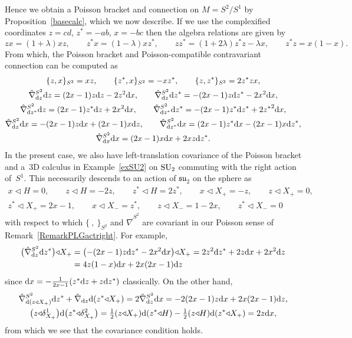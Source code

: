 \documentclass[10pt,a4paper]{amsart}
\numberwithin{equation}{section}
\newcommand{\<}{{\langle}}
\renewcommand{\>}{{\rangle}}
\newcommand{\extd}{{\rm d}}
\newcommand{\ra}{{\triangleleft}}
\begin{document}
\begin{Example}
Hence we obtain a Poisson bracket and connection on $M=S^2/S^1$ by Proposition~\ref{basecalc}, which we now describe. If we use the complexified coordinates $z=cd$, $z^*=-ab$, $x=-bc$ then the algebra relations are given by
\[ zx=(1+\lambda)xz, \qquad z^*x=(1-\lambda)xz^*, \qquad zz^*=(1+2\lambda)z^*z-\lambda x, \qquad z^*z=x(1-x).\]
From which, the Poisson bracket and Poisson-compatible contravariant connection can be computed as
\begin{gather*}
 \{ z,x \}_{S^2}=xz, \qquad \{ z^*,x \}_{S^2}=-xz^*, \qquad \{ z,z^* \}_{S^2}=2z^*zx, \\
\hat\nabla^{S^2}_{\extd z}\extd z=(2x-1)z\extd z-2z^2\extd x, \qquad \hat\nabla^{S^2}_{\extd z}\extd z^*=-(2x-1)z\extd z^*-2x^2\extd x,\\
\hat\nabla^{S^2}_{\extd z^*}\extd z=(2x-1)z^*\extd z+2x^2\extd x, \qquad \hat\nabla^{S^2}_{\extd z^*}\extd z^*=-(2x-1)z^*\extd z^*+2{z^*}^2\extd x, \\
 \hat\nabla^{S^2}_{\extd z}\extd x=-(2x-1)z\extd x+(2x-1)x\extd z, \qquad \hat\nabla^{S^2}_{\extd z^*}\extd x=(2x-1)z^*\extd x-(2x-1)x\extd z^*,\\
 \hat\nabla^{S^2}_{\extd x}\extd x=(2x-1)x\extd x+2xz\extd z^*.\end{gather*}
In the present case, we also have left-translation covariance of the Poisson bracket and a~3D calculus in Example~\ref{exSU2} on ${\rm SU}_2$ commuting with the right action of~$S^1$. This necessarily descends to an action of ${\mathfrak{su}}_2$ on the sphere as
\begin{gather*} x\ra H=0, \qquad z\ra H= -2z, \qquad z^*\ra H=2z^*,\qquad x\ra X_+=-z,\qquad z\ra X_+= 0,\\
z^*\ra X_+=2x-1,\qquad x\ra X_-=z^*, \qquad z\ra X_-=1-2x, \qquad z^*\ra X_-=0\end{gather*}
with respect to which $\{\ ,\ \}_{S^2}$ and $\hat\nabla^{S^2}$ are covariant in our Poisson sense of Remark~\ref{RemarkPLGactright}. For example,
\begin{align*} \big(\hat\nabla^{S^2}_{\extd z}\extd z^*\big)\ra X_+&=\big({-}(2x-1)z\extd z^*-2x^2\extd x\big)\ra X_+=2z^2\extd z^*+2z\extd x+2x^2\extd z\\
&=4z(1-x)\extd x+2x(2x-1)\extd z\end{align*}
since $\extd x=-{1\over{2x-1}}(z^*\extd z+z\extd z^*)$ classically. On the other hand,
\begin{gather*} \hat\nabla^{S^2}_{\extd(z\ra X_+)}\extd z^* +\hat\nabla_{\extd z}\extd(z^*\ra X_+)=2\hat\nabla^{S^2}_{\extd z}\extd x=-2(2x-1)z\extd x+2x(2x-1)\extd z, \\
 \big(z\ra\delta^1_{X_+}\big) \extd\big(z^*\ra\delta^2_{X_+}\big)=\tfrac{1}{2} (z\ra X_+)\extd(z^*\ra H)-\tfrac{1}{2} (z\ra H)\extd(z^*\ra X_+)=2z\extd x, \end{gather*}
from which we see that the covariance condition holds.
\end{Example}
\end{document}
